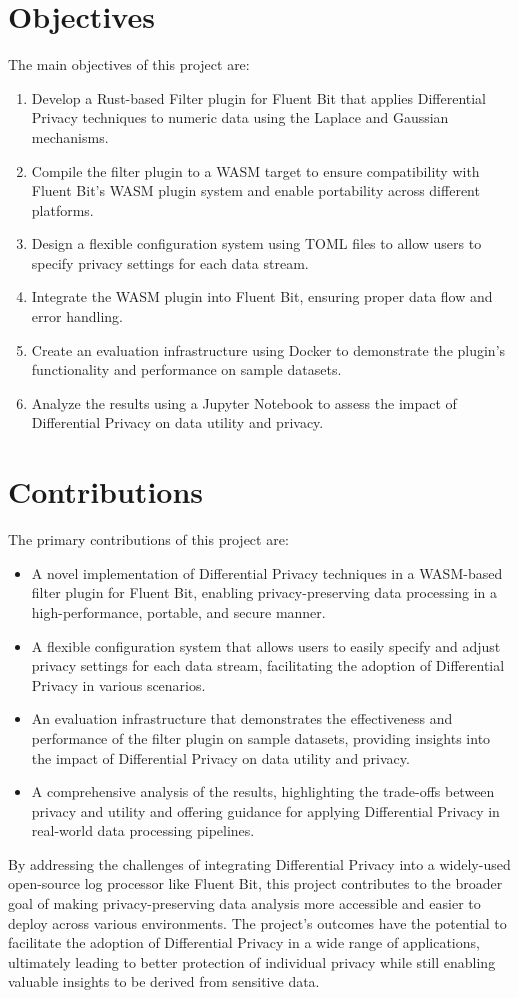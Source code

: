 \section{Objectives}
The main objectives of this project are:
\begin{enumerate}
\item Develop a Rust-based Filter plugin for Fluent Bit that applies Differential Privacy techniques to numeric data using the Laplace and Gaussian mechanisms.
\item Compile the filter plugin to a WASM target to ensure compatibility with Fluent Bit's WASM plugin system and enable portability across different platforms.
\item Design a flexible configuration system using TOML files to allow users to specify privacy settings for each data stream.
\item Integrate the WASM plugin into Fluent Bit, ensuring proper data flow and error handling.
\item Create an evaluation infrastructure using Docker to demonstrate the plugin's functionality and performance on sample datasets.
\item Analyze the results using a Jupyter Notebook to assess the impact of Differential Privacy on data utility and privacy.
\end{enumerate}
\section{Contributions}
The primary contributions of this project are:
\begin{itemize}
\item A novel implementation of Differential Privacy techniques in a WASM-based filter plugin for Fluent Bit, enabling privacy-preserving data processing in a high-performance, portable, and secure manner.
\item A flexible configuration system that allows users to easily specify and adjust privacy settings for each data stream, facilitating the adoption of Differential Privacy in various scenarios.
\item An evaluation infrastructure that demonstrates the effectiveness and performance of the filter plugin on sample datasets, providing insights into the impact of Differential Privacy on data utility and privacy.
\item A comprehensive analysis of the results, highlighting the trade-offs between privacy and utility and offering guidance for applying Differential Privacy in real-world data processing pipelines.
\end{itemize}
By addressing the challenges of integrating Differential Privacy into a widely-used open-source log processor like Fluent Bit, this project contributes to the broader goal of making privacy-preserving data analysis more accessible and easier to deploy across various environments. The project's outcomes have the potential to facilitate the adoption of Differential Privacy in a wide range of applications, ultimately leading to better protection of individual privacy while still enabling valuable insights to be derived from sensitive data.

